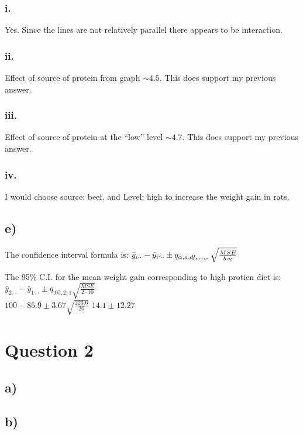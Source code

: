 \documentclass{article}
\begin{document}
\subsubsection*{i.}
Yes. Since the lines are not relatively parallel there appears to be interaction.
\subsubsection*{ii.}
Effect of source of protein from graph $\sim 4.5$. This does support my previous answer.
\subsubsection*{iii.}
Effect of source of protein at the “low” level $\sim 4.7$. This does support my previous answer.
\subsubsection*{iv.}
I would choose source: beef, and Level: high to increase the weight gain in rats.
\subsection*{e)}
The confidence interval formula is:
$\bar{y}_{i \cdot \cdot} - \bar{y}_{i` \cdot \cdot} \pm q_{\alpha, a, df_{error}}\sqrt{\frac{MSE}{b \cdot n}}$

The 95\% C.I. for the mean weight gain corresponding to high protien diet is:
$\bar{y}_{2 \cdot \cdot} - \bar{y}_{1 \cdot \cdot} \pm q_{.05, 2, 1}\sqrt{\frac{MSE}{2 \cdot 10}}$ \\
$100 - 85.9 \pm 3.67\sqrt{\frac{223.6}{20}}$
$14.1 \pm 12.27$
\section*{Question 2}
\subsection*{a)}
\subsection*{b)}
\end{document}
